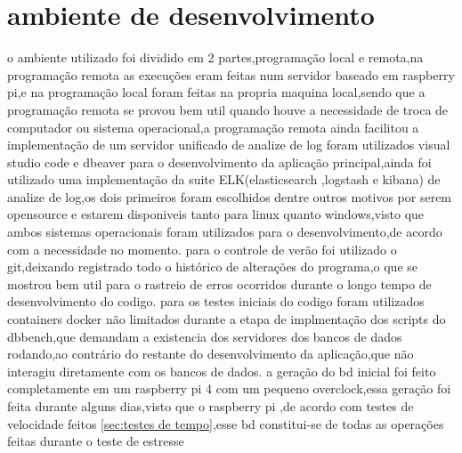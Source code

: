 \documentclass[
	12pt,				%
	openright,			%
	oneside,			%
	a4paper,			%
	english,			%
	french,				%
	spanish,			%
	brazil,				%
	]{abntex2}
\begin{document}
\section{ambiente de desenvolvimento}
\label{sec:ambiente de desenvolvimento}
o ambiente utilizado foi dividido em 2 partes,programação local e remota,na programação remota as execuções eram feitas num servidor baseado em raspberry pi,e na programação local foram feitas na propria maquina local,sendo que a programação remota se provou bem util quando houve a necessidade de troca de computador ou sistema operacional,a programação remota ainda facilitou a implementação de um servidor unificado de analize de log\newline
foram utilizados visual studio code e dbeaver para o desenvolvimento da aplicação principal,ainda foi utilizado uma implementação da suite ELK(elasticsearch ,logstash e kibana) de analize de log,os dois primeiros foram escolhidos dentre outros motivos por serem opensource e estarem disponiveis tanto para linux quanto windows,visto que ambos sistemas operacionais foram utilizados para o desenvolvimento,de acordo com a necessidade no momento.\newline
para o controle de verão foi utilizado o git,deixando registrado todo o histórico de alterações do programa,o que se mostrou bem util para o rastreio de erros ocorridos durante o longo tempo de desenvolvimento do codigo.\newline
para os testes iniciais do codigo foram utilizados containers docker não limitados durante a etapa de implmentação dos scripts do dbbench,que demandam a existencia dos servidores dos bancos de dados rodando,ao contrário do restante do desenvolvimento da aplicação,que não interagiu diretamente com os bancos de dados.\newline
a geração do bd inicial foi feito completamente em um raspberry pi 4 com um pequeno overclock,essa geração foi feita durante alguns dias,visto que o raspberry pi ,de acordo com testes de velocidade feitos \autoref{sec:testes de tempo},esse bd constitui-se de todas as operações feitas durante o teste de estresse
\end{document}

